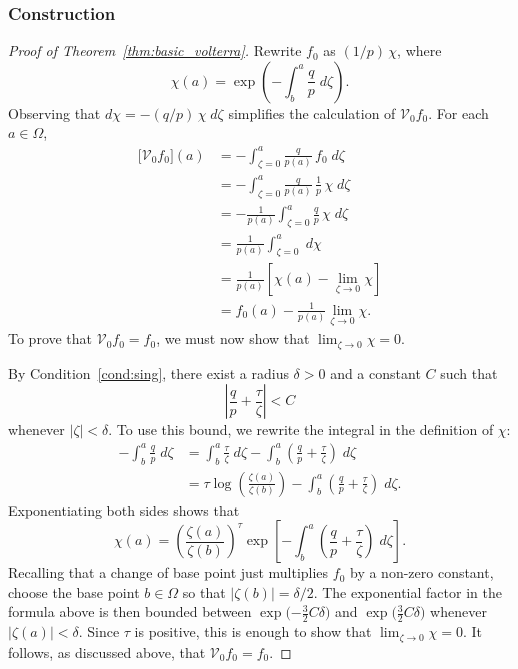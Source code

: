 \documentclass[final]{siamart220329}
\newcommand{\hardpart}{\mathcal{V}_0}
\newcommand{\solproto}{f_0}
\newcommand{\domain}{\Omega}
\begin{document}
\subsubsection{Construction}\label{sec:construction}
\begin{proof}[Proof of Theorem~\ref{thm:basic_volterra}]
Rewrite $\solproto$ as $(1/p)\,\chi$, where
\[ \chi(a) = \exp\left(-\int_{b}^{a}\frac{q}{p}\;d\zeta\right). \]
Observing that $d\chi = -(q/p)\,\chi\;d\zeta$ simplifies the calculation of $\hardpart \solproto$. For each $a \in \domain$,
\begin{align*}
\big[\hardpart \solproto\big](a) &= - \int_{\zeta=0}^{a} \frac{q}{p(a)}\,\solproto\;d\zeta \\
& = -\int_{\zeta=0}^{a} \frac{q}{p(a)}\,\frac{1}{p}\,\chi\;d\zeta \\
& = - \frac{1}{p(a)}  \int_{\zeta=0}^{a} \frac{q}{p}\,\chi\;d\zeta\\
& = \frac{1}{p(a)} \int_{\zeta=0}^{a}\;d\chi \\
& = \frac{1}{p(a)} \left[ \chi(a) - \lim_{\zeta \to 0} \chi \right] \\
& = \solproto(a) - \frac{1}{p(a)} \lim_{\zeta \to 0} \chi.
\end{align*}
To prove that $\hardpart \solproto = \solproto$, we must now show that $\lim_{\zeta \to 0} \chi = 0$.

By Condition~\eqref{cond:sing}, there exist a radius $\delta>0$ and a constant $C$ such that
\begin{equation}\label{eqn:sing-bound}
\left|\frac{q}{p} + \frac{\tau}{\zeta}\right| < C
\end{equation}
whenever $|\zeta| < \delta$. To use this bound, we rewrite the integral in the definition of $\chi$:
\begin{align*}
-\int_b^a \frac{q}{p}\;d\zeta & = \int_b^a \frac{\tau}{\zeta}\;d\zeta - \int_b^a \left( \frac{q}{p} + \frac{\tau}{\zeta} \right)\;d\zeta \\
& = \tau \log\left(\frac{\zeta(a)}{\zeta(b)}\right) - \int_b^a \left( \frac{q}{p} + \frac{\tau}{\zeta} \right)\;d\zeta.
\end{align*}
Exponentiating both sides shows that
\[ \chi(a) = \left(\frac{\zeta(a)}{\zeta(b)}\right)^\tau \exp\left[-\int_b^a \left( \frac{q}{p} + \frac{\tau}{\zeta} \right)\;d\zeta\right]. \]
Recalling that a change of base point just multiplies $\solproto$ by a non-zero constant, choose the base point $b \in \Omega$ so that $|\zeta(b)| = \delta/2$. The exponential factor in the formula above is then bounded between $\exp\big({-\tfrac{3}{2}C\delta}\big)$ and $\exp\big(\tfrac{3}{2}C\delta\big)$ whenever $|\zeta(a)| < \delta$. Since $\tau$ is positive, this is enough to show that $\lim_{\zeta \to 0} \chi = 0$. It follows, as discussed above, that $\hardpart \solproto = \solproto$.
\end{proof}
\end{document}
